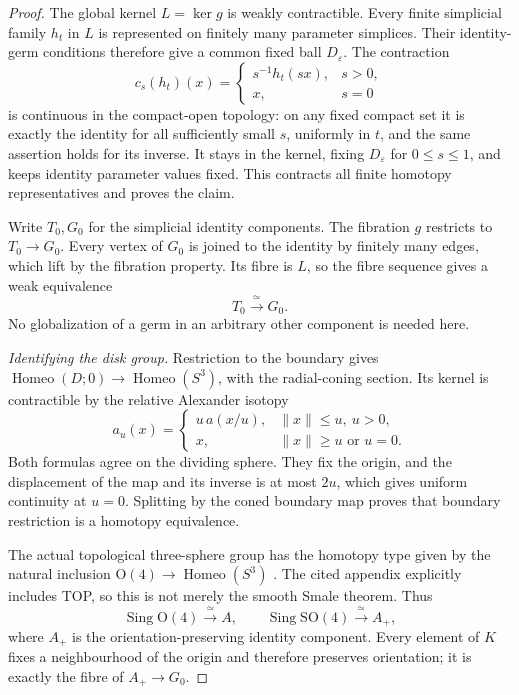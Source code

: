 \begin{proof}
The global kernel $L=\ker g$ is weakly contractible.
Every finite simplicial family $h_t$ in $L$ is represented on finitely
many parameter simplices. Their identity-germ conditions therefore
give a common fixed ball $D_\varepsilon$. The contraction
\[
 c_s(h_t)(x)=
 \begin{cases}s^{-1}h_t(sx),&s>0,\\x,&s=0\end{cases}
\]
is continuous in the compact-open topology: on any fixed compact
set it is exactly the identity for all sufficiently small $s$,
uniformly in $t$, and the same assertion holds for its inverse.
It stays in the kernel, fixing $D_\varepsilon$ for $0\leq s\leq1$,
and keeps identity parameter values fixed.  This contracts all
finite homotopy representatives and proves the claim.

Write $T_0,G_0$ for the simplicial identity components.  The
fibration $g$ restricts to $T_0\to G_0$.  Every vertex of $G_0$
is joined to the identity by finitely many edges, which lift by
the fibration property.  Its fibre is $L$, so the fibre sequence
gives a weak equivalence
\[
                            T_0\xrightarrow{\ \simeq\ }G_0.
\]
No globalization of a germ in an arbitrary other component is
needed here.

\medskip\noindent\textit{Identifying the disk group.}
Restriction to the boundary gives
$\operatorname{Homeo}(D;0)\to\operatorname{Homeo}(S^3)$,
with the radial-coning section.  Its kernel is contractible by
the relative Alexander isotopy
\[
 a_u(x)=
 \begin{cases}
      u\,a(x/u),&\|x\|\leq u,\ u>0,\\
      x,&\|x\|\geq u\text{ or }u=0.
 \end{cases}
\]
Both formulas agree on the dividing sphere.  They fix the origin,
and the displacement of the map and its inverse is at most $2u$,
which gives uniform continuity at $u=0$.  Splitting by the coned
boundary map proves that boundary restriction is a homotopy
equivalence.

The actual topological three-sphere group has the homotopy type
given by the natural inclusion
$\mathrm O(4)\to\operatorname{Homeo}(S^3)$
\cite[Appendix, statements~(3) and~(16), pp.~605--606]{Hatcher1983}.
The cited appendix explicitly includes TOP, so this is not merely
the smooth Smale theorem.  Thus
\[
      \operatorname{Sing}\mathrm O(4)\xrightarrow{\ \simeq\ }A,
 \qquad \operatorname{Sing}\mathrm{SO}(4)\xrightarrow{\ \simeq\ }A_+,
\]
where $A_+$ is the orientation-preserving identity component.
Every element of $K$ fixes a neighbourhood of the origin and
therefore preserves orientation; it is exactly the fibre of
$A_+\to G_0$.


\end{proof}
